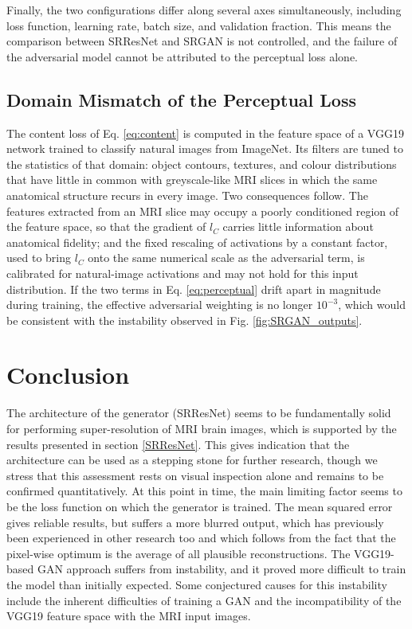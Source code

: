 \documentclass[conference]{IEEEtran}
\begin{document}
Finally, the two configurations differ along several axes simultaneously, including loss function, learning rate, batch size, and validation fraction. This means the comparison between SRResNet and SRGAN is not controlled, and the failure of the adversarial model cannot be attributed to the perceptual loss alone.

\subsection{Domain Mismatch of the Perceptual Loss}
The content loss of Eq. \eqref{eq:content} is computed in the feature space of a VGG19 network trained to classify natural images from ImageNet. Its filters are tuned to the statistics of that domain: object contours, textures, and colour distributions that have little in common with greyscale-like MRI slices in which the same anatomical structure recurs in every image. Two consequences follow. The features extracted from an MRI slice may occupy a poorly conditioned region of the feature space, so that the gradient of $l_C$ carries little information about anatomical fidelity; and the fixed rescaling of activations by a constant factor, used to bring $l_C$ onto the same numerical scale as the adversarial term, is calibrated for natural-image activations and may not hold for this input distribution. If the two terms in Eq. \eqref{eq:perceptual} drift apart in magnitude during training, the effective adversarial weighting is no longer $10^{-3}$, which would be consistent with the instability observed in Fig. \ref{fig:SRGAN_outputs}.

\section{Conclusion}
The architecture of the generator (SRResNet) seems to be fundamentally solid for performing super-resolution of MRI brain images, which is supported by the results presented in section \ref{SRResNet}. This gives indication that the architecture can be used as a stepping stone for further research, though we stress that this assessment rests on visual inspection alone and remains to be confirmed quantitatively. At this point in time, the main limiting factor seems to be the loss function on which the generator is trained. The mean squared error gives reliable results, but suffers a more blurred output, which has previously been experienced in other research too and which follows from the fact that the pixel-wise optimum is the average of all plausible reconstructions. The VGG19-based GAN approach suffers from instability, and it proved more difficult to train the model than initially expected. Some conjectured causes for this instability include the inherent difficulties of training a GAN and the incompatibility of the VGG19 feature space with the MRI input images.
\end{document}
